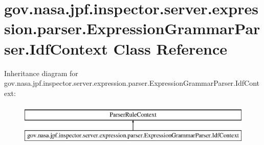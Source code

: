 \hypertarget{classgov_1_1nasa_1_1jpf_1_1inspector_1_1server_1_1expression_1_1parser_1_1_expression_grammar_parser_1_1_idf_context}{}\section{gov.\+nasa.\+jpf.\+inspector.\+server.\+expression.\+parser.\+Expression\+Grammar\+Parser.\+Idf\+Context Class Reference}
\label{classgov_1_1nasa_1_1jpf_1_1inspector_1_1server_1_1expression_1_1parser_1_1_expression_grammar_parser_1_1_idf_context}
Inheritance diagram for gov.\+nasa.\+jpf.\+inspector.\+server.\+expression.\+parser.\+Expression\+Grammar\+Parser.\+Idf\+Context\+:\begin{figure}[H]
\begin{center}
\leavevmode
\includegraphics[height=2.000000cm]{classgov_1_1nasa_1_1jpf_1_1inspector_1_1server_1_1expression_1_1parser_1_1_expression_grammar_parser_1_1_idf_context}
\end{center}
\end{figure}

